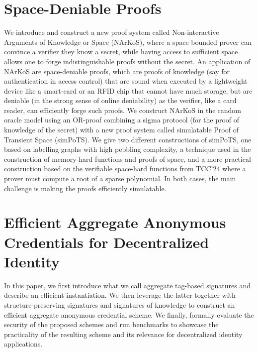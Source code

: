 \documentclass[11pt]{article}
\theoremstyle{definition}
\theoremstyle{remark}
\theoremstyle{plain}
\begin{document}
\section{\cite{cryptoeprint:2025/1723} Space-Deniable Proofs}
We introduce and construct a new proof system called Non-interactive Arguments of Knowledge or Space (NArKoS), where a space bounded prover can convince a verifier they know a secret, while having access to sufficient space allows one to forge indistinguishable proofs without the secret. An application of NArKoS are space-deniable proofs, which are proofs of knowledge (say for authentication in access control) that are sound when executed by a lightweight device like a smart-card or an RFID chip that cannot have much storage, but are deniable (in the strong sense of online deniability) as the verifier, like a card reader, can efficiently forge such proofs. We construct NArKoS in the random oracle model using an OR-proof combining a sigma protocol (for the proof of knowledge of the secret) with a new proof system called simulatable Proof of Transient Space (simPoTS). We give two different constructions of simPoTS, one based on labelling graphs with high pebbling complexity, a technique used in the construction of memory-hard functions and proofs of space, and a more practical construction based on the verifiable space-hard functions from TCC'24 where a prover must compute a root of a sparse polynomial. In both cases, the main challenge is making the proofs efficiently simulatable.

\section{\cite{cryptoeprint:2025/1724} Efficient Aggregate Anonymous Credentials for Decentralized Identity}
In this paper, we first introduce what we call aggregate tag-based signatures and describe an efficient instantiation. We then leverage the latter together with structure-preserving signatures and signatures of knowledge to construct an efficient aggregate anonymous credential scheme. We finally, formally evaluate the security of the proposed schemes and run benchmarks to showcase the practicality of the resulting scheme and its relevance for decentralized identity applications.
\end{document}
